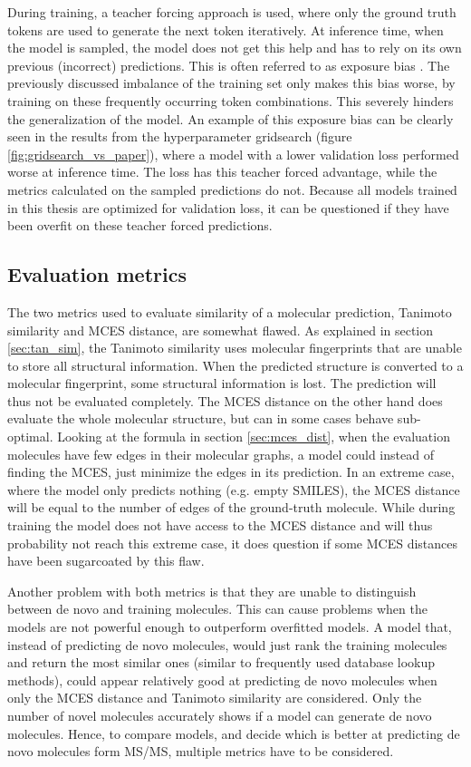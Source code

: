 During training, a teacher forcing approach is used, where only the ground truth tokens are used to generate the next token iteratively.
At inference time, when the model is sampled, the model does not get this help and has to rely on its own previous (incorrect) predictions.
This is often referred to as exposure bias \cite{schmidt2019generalization}.
The previously discussed imbalance of the training set only makes this bias worse, by training on these frequently occurring token combinations.
This severely hinders the generalization of the model.
An example of this exposure bias can be clearly seen in the results from the hyperparameter gridsearch (figure \ref{fig:gridsearch_vs_paper}), where a model with a lower validation loss performed worse at inference time.
The loss has this teacher forced advantage, while the metrics calculated on the sampled predictions do not.
Because all models trained in this thesis are optimized for validation loss, it can be questioned if they have been overfit on these teacher forced predictions.

\subsection{Evaluation metrics}
The two metrics used to evaluate similarity of a molecular prediction, Tanimoto similarity and \ac{MCES} distance, are somewhat flawed.
As explained in section \ref{sec:tan_sim}, the Tanimoto similarity uses molecular fingerprints that are unable to store all structural information.
When the predicted structure is converted to a molecular fingerprint, some structural information is lost.
The prediction will thus not be evaluated completely.
The \ac{MCES} distance on the other hand does evaluate the whole molecular structure, but can in some cases behave sub-optimal.
Looking at the formula in section \ref{sec:mces_dist}, when the evaluation molecules have few edges in their molecular graphs, a model could instead of finding the \acf{MCES}, just minimize the edges in its prediction.
In an extreme case, where the model only predicts nothing (e.g. empty SMILES), the MCES distance will be equal to the number of edges of the ground-truth molecule.
While during training the model does not have access to the MCES distance and will thus probability not reach this extreme case, it does question if some \ac{MCES} distances have been sugarcoated by this flaw.

Another problem with both metrics is that they are unable to distinguish between de novo and training molecules.
This can cause problems when the models are not powerful enough to outperform overfitted models.
A model that, instead of predicting de novo molecules, would just rank the training molecules and return the most similar ones (similar to frequently used database lookup methods), could appear relatively good at predicting de novo molecules when only the \ac{MCES} distance and Tanimoto similarity are considered.
Only the number of novel molecules accurately shows if a model can generate de novo molecules.
Hence, to compare models, and decide which is better at predicting de novo molecules form \ac{MS/MS}, multiple metrics have to be considered.



